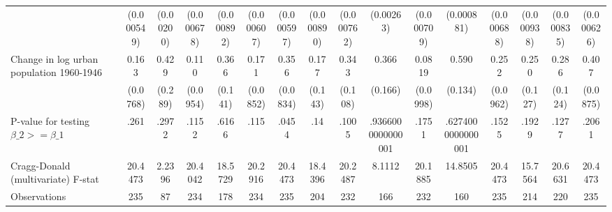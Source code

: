 {\begin{tabular}{l*{15}{c}}
                &(0.000549)         &(0.00200)         &(0.000678)         &(0.000892)         &(0.000607)         &(0.000597)         &(0.000890)         &(0.000762)         &(0.00263)         &(0.000709)         &(0.000881)         &(0.000688)         &(0.000938)         &(0.000835)         &(0.000626)         \\
[1em]
Change in log urban population 1960-1946&    0.163\sym{**} &    0.429         &    0.110         &    0.366\sym{**} &    0.171\sym{**} &    0.356\sym{***}&    0.177         &    0.343\sym{***}&    0.366\sym{**} &   0.0819         &    0.590\sym{***}&    0.252\sym{***}&    0.250\sym{*}  &    0.286\sym{**} &    0.407\sym{***}\\
                & (0.0768)         &  (0.289)         & (0.0954)         &  (0.141)         & (0.0852)         & (0.0834)         &  (0.143)         &  (0.108)         &  (0.166)         & (0.0998)         &  (0.134)         & (0.0962)         &  (0.127)         &  (0.124)         & (0.0875)         \\
\hline
P-value for testing $\beta\_{2} >= \beta\_{1}$&     .261         &    .2972         &    .1152         &    .6166         &     .115         &    .0454         &      .14         &    .1005         &.9366000000000001         &    .1751         &.6274000000000001         &    .1525         &    .1929         &    .1277         &    .2061         \\
Cragg-Donald (multivariate) F-stat&  20.4473         &   2.2396         &  20.4042         &  18.5729         &  20.2916         &  20.4473         &  18.4396         &  20.2487         &   8.1112         &  20.1885         &  14.8505         &  20.4473         &  15.7564         &  20.6631         &  20.4473         \\
Observations    &      235         &       87         &      234         &      178         &      234         &      235         &      204         &      232         &      166         &      232         &      160         &      235         &      214         &      220         &      235         \\
\hline\hline
\end{tabular}
}

